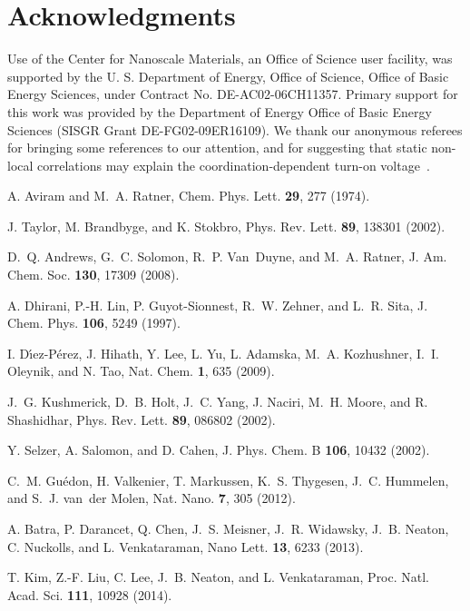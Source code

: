 \documentclass[11pt,showpacs,amsmath,amssymbl]{revtex4}
\begin{document}
\section{Acknowledgments}

Use of the Center for Nanoscale Materials, an Office of Science user facility, was supported by the U. S. Department of Energy, Office of Science, Office of Basic Energy Sciences, under Contract No. DE-AC02-06CH11357.  Primary support for this work was provided by the Department of Energy Office of Basic Energy Sciences (SISGR Grant DE-FG02-09ER16109).  {We thank our anonymous referees for bringing some references to our attention, and for suggesting that static non-local correlations may explain the coordination-dependent turn-on voltage~\cite{FernandezTorrente}.}
\begin{thebibliography}{10}

A. Aviram and M.~A. Ratner, Chem. Phys. Lett. {\bf 29},  277  (1974).

J. Taylor, M. Brandbyge, and K. Stokbro, Phys. Rev. Lett. {\bf
  89},  138301  (2002).

D.~Q. Andrews, G.~C. Solomon, R.~P. Van~Duyne, and M.~A. Ratner, J. Am. Chem.
  Soc. {\bf 130},  17309  (2008).

A. Dhirani, P.-H. Lin, P. Guyot-Sionnest, R.~W. Zehner, and L.~R. Sita, J. Chem. Phys. {\bf 106},  5249  (1997).

I. D{\'\i}ez-P{\'e}rez, J. Hihath, Y. Lee, L. Yu, L. Adamska, M.~A. Kozhushner,
  I.~I. Oleynik, and N. Tao, Nat. Chem. {\bf 1},  635  (2009).

J.~G. Kushmerick, D.~B. Holt, J.~C. Yang, J. Naciri, M.~H. Moore, and R.
  Shashidhar, Phys. Rev. Lett. {\bf 89},  086802  (2002).

Y. Selzer, A. Salomon, and D. Cahen, J. Phys. Chem. B {\bf 106},  10432
  (2002).

C.~M. Gu{\'e}don, H. Valkenier, T. Markussen, K.~S. Thygesen,
  J.~C. Hummelen, and S.~J. van~der Molen, Nat. Nano. {\bf 7},
  305  (2012).

A. Batra, P. Darancet, Q. Chen, J.~S. Meisner, J.~R. Widawsky, J.~B. Neaton, C.
  Nuckolls, and L. Venkataraman, Nano Lett. {\bf 13},  6233  (2013).

T. Kim, Z.-F. Liu, C. Lee, J.~B. Neaton, and L. Venkataraman, Proc. Natl. Acad.
  Sci. {\bf 111},  10928  (2014).


\end{thebibliography}
\end{document}
